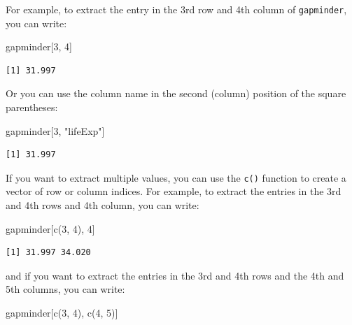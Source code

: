 \documentclass[
  letterpaper,
  DIV=11,
  numbers=noendperiod]{scrreprt}
\newenvironment{Shaded}{\begin{snugshade}}{\end{snugshade}}
\newcommand{\DecValTok}[1]{\textcolor[rgb]{0.68,0.00,0.00}{#1}}
\newcommand{\FunctionTok}[1]{\textcolor[rgb]{0.28,0.35,0.67}{#1}}
\newcommand{\NormalTok}[1]{\textcolor[rgb]{0.00,0.23,0.31}{#1}}
\newcommand{\StringTok}[1]{\textcolor[rgb]{0.13,0.47,0.30}{#1}}
\begin{document}
For example, to extract the entry in the 3rd row and 4th column of
\texttt{gapminder}, you can write:

\begin{Shaded}
\begin{Highlighting}[]
\NormalTok{gapminder[}\DecValTok{3}\NormalTok{, }\DecValTok{4}\NormalTok{]}
\end{Highlighting}
\end{Shaded}

\begin{verbatim}
[1] 31.997
\end{verbatim}

Or you can use the column name in the second (column) position of the
square parentheses:

\begin{Shaded}
\begin{Highlighting}[]
\NormalTok{gapminder[}\DecValTok{3}\NormalTok{, }\StringTok{"lifeExp"}\NormalTok{]}
\end{Highlighting}
\end{Shaded}

\begin{verbatim}
[1] 31.997
\end{verbatim}

If you want to extract multiple values, you can use the \texttt{c()}
function to create a vector of row or column indices. For example, to
extract the entries in the 3rd and 4th rows and 4th column, you can
write:

\begin{Shaded}
\begin{Highlighting}[]
\NormalTok{gapminder[}\FunctionTok{c}\NormalTok{(}\DecValTok{3}\NormalTok{, }\DecValTok{4}\NormalTok{), }\DecValTok{4}\NormalTok{]}
\end{Highlighting}
\end{Shaded}

\begin{verbatim}
[1] 31.997 34.020
\end{verbatim}

and if you want to extract the entries in the 3rd and 4th rows and the
4th and 5th columns, you can write:

\begin{Shaded}
\begin{Highlighting}[]
\NormalTok{gapminder[}\FunctionTok{c}\NormalTok{(}\DecValTok{3}\NormalTok{, }\DecValTok{4}\NormalTok{), }\FunctionTok{c}\NormalTok{(}\DecValTok{4}\NormalTok{, }\DecValTok{5}\NormalTok{)]}
\end{Highlighting}
\end{Shaded}
\end{document}
